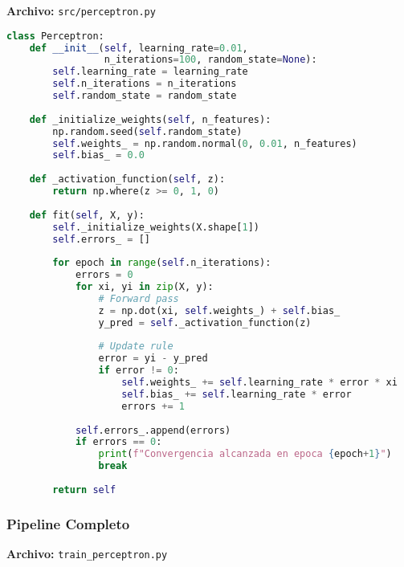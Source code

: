 \documentclass[12pt]{src/formato_utem}
\begin{document}
\textbf{Archivo:} \texttt{src/perceptron.py}

\begin{lstlisting}[language=Python]
class Perceptron:
    def __init__(self, learning_rate=0.01, 
                 n_iterations=100, random_state=None):
        self.learning_rate = learning_rate
        self.n_iterations = n_iterations
        self.random_state = random_state
        
    def _initialize_weights(self, n_features):
        np.random.seed(self.random_state)
        self.weights_ = np.random.normal(0, 0.01, n_features)
        self.bias_ = 0.0
        
    def _activation_function(self, z):
        return np.where(z >= 0, 1, 0)
    
    def fit(self, X, y):
        self._initialize_weights(X.shape[1])
        self.errors_ = []
        
        for epoch in range(self.n_iterations):
            errors = 0
            for xi, yi in zip(X, y):
                # Forward pass
                z = np.dot(xi, self.weights_) + self.bias_
                y_pred = self._activation_function(z)
                
                # Update rule
                error = yi - y_pred
                if error != 0:
                    self.weights_ += self.learning_rate * error * xi
                    self.bias_ += self.learning_rate * error
                    errors += 1
            
            self.errors_.append(errors)
            if errors == 0:
                print(f"Convergencia alcanzada en epoca {epoch+1}")
                break
        
        return self
\end{lstlisting}

\subsubsection{Pipeline Completo}

\textbf{Archivo:} \texttt{train\_perceptron.py}
\end{document}
